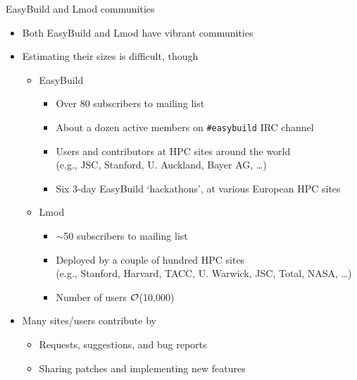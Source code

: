 \documentclass[10pt,xcolor={usenames,dvipsnames}]{beamer}
\begin{document}
\begin{frame}{EasyBuild and Lmod communities}
\begin{itemize}
    \item
        Both EasyBuild and Lmod have vibrant communities
    \item
        Estimating their sizes is difficult, though
        \begin{itemize}
            \item
                EasyBuild
                \begin{itemize}
                    \item
                        Over 80 subscribers to mailing list
                    \item
                        About a dozen active members on \texttt{\#easybuild} IRC channel
                    \item
                        Users and contributors at HPC sites around the world\\
                        (e.g., JSC, Stanford, U. Auckland, Bayer AG, \ldots)
                    \item
                        Six 3-day EasyBuild `hackathons', at various European HPC sites
                \end{itemize}
            \item
                Lmod
                \begin{itemize}
                    \item
                        $\sim$50 subscribers to mailing list
                    \item
                        Deployed by a couple of hundred HPC sites\\
                        (e.g., Stanford, Harvard, TACC, U. Warwick,
                        JSC, Total, NASA, \ldots)
                    \item
                        Number of users $\cal{O}$(10,000)
                \end{itemize}
        \end{itemize}
    \item
        Many sites/users contribute by
        \begin{itemize}
            \item
                Requests, suggestions, and bug reports
            \item
                Sharing patches and implementing new features
        \end{itemize}
\end{itemize}
\end{frame}
\end{document}
